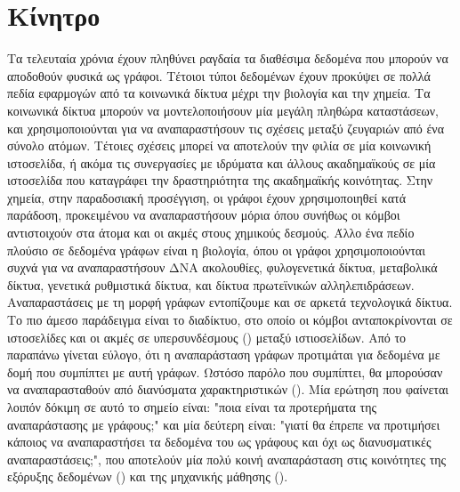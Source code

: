 \section{Κίνητρο}
Τα τελευταία χρόνια έχουν πληθύνει ραγδαία τα διαθέσιμα δεδομένα που μπορούν να αποδοθούν φυσικά ως γράφοι.
Τέτοιοι τύποι δεδομένων έχουν προκύψει σε πολλά πεδία εφαρμογών από τα κοινωνικά δίκτυα μέχρι την βιολογία και την χημεία. Τα κοινωνικά δίκτυα μπορούν να μοντελοποιήσουν μία μεγάλη πληθώρα καταστάσεων, και χρησιμοποιούνται για να αναπαραστήσουν τις σχέσεις μεταξύ ζευγαριών από ένα σύνολο ατόμων.
Τέτοιες σχέσεις μπορεί να αποτελούν την φιλία σε μία κοινωνική ιστοσελίδα, ή ακόμα τις συνεργασίες με ιδρύματα και άλλους ακαδημαϊκούς σε μία ιστοσελίδα που καταγράφει την δραστηριότητα της ακαδημαϊκής κοινότητας.
Στην χημεία, στην παραδοσιακή προσέγγιση, οι γράφοι έχουν χρησιμοποιηθεί κατά παράδοση, προκειμένου να αναπαραστήσουν μόρια όπου συνήθως οι κόμβοι αντιστοιχούν στα άτομα και οι ακμές στους χημικούς δεσμούς.
Άλλο ένα πεδίο πλούσιο σε δεδομένα γράφων είναι η βιολογία, όπου οι γράφοι χρησιμοποιούνται συχνά για να αναπαραστήσουν ΔΝΑ ακολουθίες, φυλογενετικά δίκτυα, μεταβολικά δίκτυα, γενετικά ρυθμιστικά δίκτυα, και δίκτυα πρωτεϊνικών αλληλεπιδράσεων.
Αναπαραστάσεις με τη μορφή γράφων εντοπίζουμε και σε αρκετά τεχνολογικά δίκτυα.
Το πιο άμεσο παράδειγμα είναι το διαδίκτυο, στο οποίο οι κόμβοι ανταποκρίνονται σε ιστοσελίδες και οι ακμές σε υπερσυνδέσμους () μεταξύ ιστιοσελίδων. Από το παραπάνω γίνεται εύλογο, ότι η αναπαράσταση γράφων προτιμάται για δεδομένα με δομή που συμπίπτει με αυτή γράφων. Ωστόσο παρόλο που συμπίπτει, θα μπορούσαν να αναπαρασταθούν από διανύσματα χαρακτηριστικών (). Μία ερώτηση που φαίνεται λοιπόν δόκιμη σε αυτό το σημείο είναι: "ποια είναι τα προτερήματα της αναπαράστασης με γράφους;" και μία δεύτερη είναι: "γιατί θα έπρεπε να προτιμήσει κάποιος να αναπαραστήσει τα δεδομένα του ως γράφους και όχι ως διανυσματικές αναπαραστάσεις;", που αποτελούν μία πολύ κοινή αναπαράσταση στις κοινότητες της εξόρυξης δεδομένων () και της μηχανικής μάθησης ().
